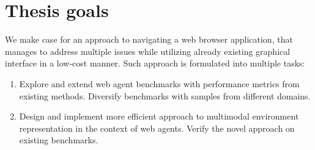 \section{Thesis goals}
We make case for an approach to navigating a web browser application, that manages to address multiple issues while utilizing already existing graphical interface in a low-cost manner. Such approach is formulated into multiple tasks:
\begin{enumerate}
    \item Explore and extend web agent benchmarks with performance metrics from existing methods. Diversify benchmarks with samples from different domains.
    \item Design and implement more efficient approach to multimodal environment representation in the context of web agents. Verify the novel approach on existing benchmarks.
\end{enumerate}